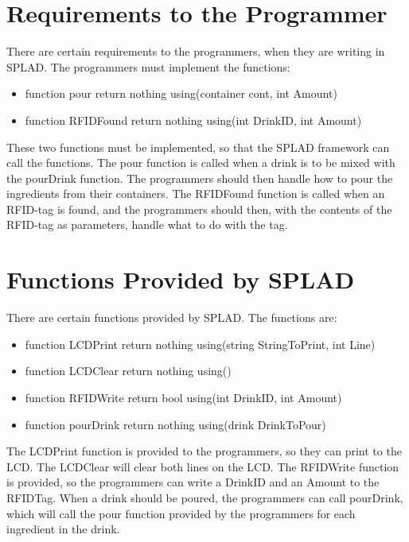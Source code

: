 \section{Requirements to the Programmer}
There are certain requirements to the programmers, when they are writing in SPLAD. The programmers must implement the functions:
\begin{itemize}
	\item {\color[rgb]{0,0,1}function} pour {\color[rgb]{0,0,1}return} {\color[rgb]{0.545,0.133,0.133}nothing} {\color[rgb]{0,0,1}using}({\color[rgb]{0.545,0.133,0.133}container} cont, {\color[rgb]{0.545,0.133,0.133}int} Amount)
	\item {\color[rgb]{0,0,1}function} RFIDFound {\color[rgb]{0,0,1}return} {\color[rgb]{0.545,0.133,0.133}nothing} {\color[rgb]{0,0,1}using}({\color[rgb]{0.545,0.133,0.133}int} DrinkID, {\color[rgb]{0.545,0.133,0.133}int} Amount)
\end{itemize}
These two functions must be implemented, so that the SPLAD framework can call the functions. The pour function is called when a drink is to be mixed with the pourDrink function. The programmers should then handle how to pour the ingredients from their containers.
The RFIDFound function is called when an RFID-tag is found, and the programmers should then, with the contents of the RFID-tag as parameters, handle what to do with the tag.

\section{Functions Provided by SPLAD}
There are certain functions provided by SPLAD. The functions are:
\begin{itemize}
	\item {\color[rgb]{0,0,1}function} LCDPrint {\color[rgb]{0,0,1}return} {\color[rgb]{0.545,0.133,0.133}nothing} {\color[rgb]{0,0,1}using}({\color[rgb]{0.545,0.133,0.133}string} StringToPrint, {\color[rgb]{0.545,0.133,0.133}int} Line)
	\item {\color[rgb]{0,0,1}function} LCDClear {\color[rgb]{0,0,1}return} {\color[rgb]{0.545,0.133,0.133}nothing} {\color[rgb]{0,0,1}using}()
	\item {\color[rgb]{0,0,1}function} RFIDWrite {\color[rgb]{0,0,1}return} {\color[rgb]{0.545,0.133,0.133}bool} {\color[rgb]{0,0,1}using}({\color[rgb]{0.545,0.133,0.133}int} DrinkID, {\color[rgb]{0.545,0.133,0.133}int} Amount)
	\item {\color[rgb]{0,0,1}function} pourDrink {\color[rgb]{0,0,1}return} {\color[rgb]{0.545,0.133,0.133}nothing} {\color[rgb]{0,0,1}using}({\color[rgb]{0.545,0.133,0.133}drink} DrinkToPour)
\end{itemize}
The LCDPrint function is provided to the programmers, so they can print to the LCD. The LCDClear will clear both lines on the LCD. The RFIDWrite function is provided, so the programmers can write a DrinkID and an Amount to the RFIDTag. When a drink should be poured, the programmers can call pourDrink, which will call the pour function provided by the programmers for each ingredient in the drink.